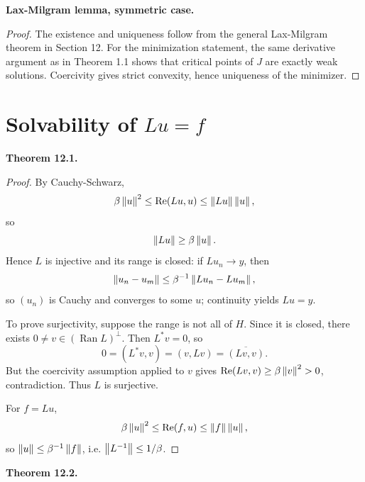 \documentclass[11pt]{article}
\newenvironment{theoremstmt}[1]{%
  \par\medskip\noindent\textbf{Theorem #1. }\itshape
}{\par\medskip}
\newenvironment{namedstmt}[1]{%
  \par\medskip\noindent\textbf{#1. }\itshape
}{\par\medskip}
\begin{document}
\begin{namedstmt}{Lax-Milgram lemma, symmetric case}
\thmLaxMilgramSymmetric
\end{namedstmt}

\begin{proof}
The existence and uniqueness follow from the general Lax-Milgram theorem in Section 12. For the minimization statement, the same derivative argument as in Theorem 1.1 shows that critical points of $J$ are exactly weak solutions. Coercivity gives strict convexity, hence uniqueness of the minimizer.
\end{proof}

\section{Solvability of \texorpdfstring{$Lu=f$}{Lu=f}}

\begin{theoremstmt}{12.1}
\thmCoerciveBijective
\end{theoremstmt}

\begin{proof}
By Cauchy-Schwarz,
\[
\beta\left\lVert u\right\rVert^2\le \operatorname{Re}(Lu,u)\le \left\lVert Lu\right\rVert\left\lVert u\right\rVert,
\]
so
\[
\left\lVert Lu\right\rVert\ge \beta\left\lVert u\right\rVert.
\]
Hence $L$ is injective and its range is closed: if $Lu_n\to y$, then
\[
\left\lVert u_n-u_m\right\rVert\le \beta^{-1}\left\lVert Lu_n-Lu_m\right\rVert,
\]
so $(u_n)$ is Cauchy and converges to some $u$; continuity yields $Lu=y$.

To prove surjectivity, suppose the range is not all of $H$. Since it is closed, there exists $0\neq v\in (\operatorname{Ran}L)^{\perp}$. Then $L^*v=0$, so
\[
0=(L^*v,v)=(v,Lv)=\overline{(Lv,v)}.
\]
But the coercivity assumption applied to $v$ gives $\operatorname{Re}(Lv,v)\ge \beta\left\lVert v\right\rVert^2>0$, contradiction. Thus $L$ is surjective.

For $f=Lu$,
\[
\beta\left\lVert u\right\rVert^2\le \operatorname{Re}(f,u)\le \left\lVert f\right\rVert\left\lVert u\right\rVert,
\]
so $\left\lVert u\right\rVert\le \beta^{-1}\left\lVert f\right\rVert$, i.e. $\left\lVert L^{-1}\right\rVert\le 1/\beta$.
\end{proof}

\begin{theoremstmt}{12.2}
\thmLaxMilgramGeneral
\end{theoremstmt}
\end{document}
